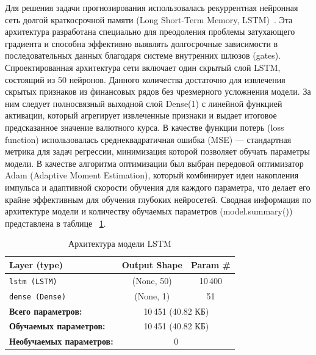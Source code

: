 \sloppy
Для решения задачи прогнозирования использовалась рекуррентная нейронная сеть долгой краткосрочной памяти (Long Short-Term Memory, LSTM)~\cite{hochreiter1997}. Эта архитектура разработана специально для преодоления проблемы затухающего градиента и способна эффективно выявлять долгосрочные зависимости в последовательных данных благодаря системе внутренних шлюзов (gates).
Спроектированная архитектура сети включает один скрытый слой LSTM, состоящий из 50 нейронов. Данного количества достаточно для извлечения скрытых признаков из финансовых рядов без чрезмерного усложнения модели. За ним следует полносвязный выходной слой Dense(1) с линейной функцией активации, который агрегирует извлеченные признаки и выдает итоговое предсказанное значение валютного курса.
В качестве функции потерь (loss function) использовалась среднеквадратичная ошибка (MSE) — стандартная метрика для задач регрессии, минимизация которой позволяет обучать параметры модели. В качестве алгоритма оптимизации был выбран передовой оптимизатор Adam (Adaptive Moment Estimation), который комбинирует идеи накопления импульса и адаптивной скорости обучения для каждого параметра, что делает его крайне эффективным для обучения глубоких нейросетей.
Сводная информация по архитектуре модели и количеству обучаемых параметров (model.summary()) представлена в таблице ~\ref{tab:lstm_architecture}.
\begin{table}[h!]
\centering
\caption{Архитектура модели LSTM}
\label{tab:lstm_architecture}
\begin{tabular}{|l|c|c|}
\hline
\textbf{Layer (type)} & \textbf{Output Shape} & \textbf{Param \#} \\ \hline
\texttt{lstm (LSTM)}  & (None, 50)            & 10\,400 \\ \hline
\texttt{dense (Dense)} & (None, 1)             & 51 \\ \hline
\textbf{Всего параметров:}      & \multicolumn{2}{c|}{10\,451 (40.82 КБ)} \\ \hline
\textbf{Обучаемых параметров:}  & \multicolumn{2}{c|}{10\,451 (40.82 КБ)} \\ \hline
\textbf{Необучаемых параметров:}& \multicolumn{2}{c|}{0} \\ \hline
\end{tabular}
\end{table}

